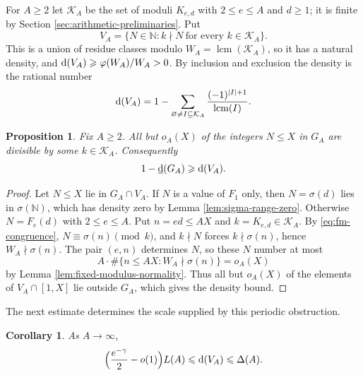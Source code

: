 \documentclass[11pt,letterpaper,reqno]{amsart}
\numberwithin{equation}{section}
\newtheorem{proposition}[theorem]{Proposition}
\newtheorem{corollary}[theorem]{Corollary}
\theoremstyle{remark}
\newcommand{\N}{\mathbb{N}}
\newcommand{\1}{\mathbf 1}
\newcommand{\lowerdens}{\underline{\textup{d}}}
\DeclareMathOperator{\lcm}{lcm}
\renewcommand{\leq}{\leqslant}
\renewcommand{\geq}{\geqslant}
\begin{document}
For $A\geq2$ let $\mathcal{K}_A$ be the set of moduli $K_{e,d}$ with
$2\leq e\leq A$ and $d\geq1$; it is finite by
Section \ref{sec:arithmetic-preliminaries}. Put
\[
 V_A=\{N\in\N:k\nmid N\ \text{for every }k\in\mathcal{K}_A\} .
\]
This is a union of residue classes modulo $W_A=\lcm(\mathcal{K}_A)$, so it has
a natural density, and $\textup{d}(V_A)\geq\varphi(W_A)/W_A>0$. By inclusion and
exclusion the density is the rational number
\[
 \textup{d}(V_A)=1-\sum_{\varnothing\neq I\subseteq\mathcal{K}_A}
 \frac{(-1)^{|I|+1}}{\lcm(I)} .
\]
\begin{proposition}\label{prop:fm-envelope}
Fix $A\geq2$. All but $o_A(X)$ of the integers $N\leq X$ in $G_A$ are
divisible by some $k\in\mathcal{K}_A$. Consequently
\[
 1-\lowerdens(G_A)\geq \textup{d}(V_A) .
\]
\end{proposition}
\begin{proof}
Let $N\leq X$ lie in $G_A\cap V_A$. If $N$ is a value of $F_1$ only, then
$N=\sigma(d)$ lies in $\sigma(\N)$, which has density zero by
Lemma \ref{lem:sigma-range-zero}. Otherwise $N=F_e(d)$ with
$2\leq e\leq A$. Put $n=ed\leq AX$ and $k=K_{e,d}\in\mathcal{K}_A$. By
\eqref{eq:fm-congruence}, $N\equiv\sigma(n)\pmod k$, and $k\nmid N$ forces
$k\nmid\sigma(n)$, hence $W_A\nmid\sigma(n)$. The pair $(e,n)$ determines
$N$, so these $N$ number at most
\[
 A\cdot\#\{n\leq AX:W_A\nmid\sigma(n)\}=o_A(X)
\]
by Lemma \ref{lem:fixed-modulus-normality}. Thus all but $o_A(X)$ of the
elements of $V_A\cap[1,X]$ lie outside $G_A$, which gives the density
bound.
\end{proof}
The next estimate determines the scale supplied by this periodic obstruction.
\begin{corollary}\label{cor:fm-envelope-tail}
As $A\to\infty$,
\[
 \Bigl(\frac{e^{-\gamma}}2-o(1)\Bigr)L(A)\leq \textup{d}(V_A)\leq\Delta(A) .
\]
\end{corollary}
\end{document}
